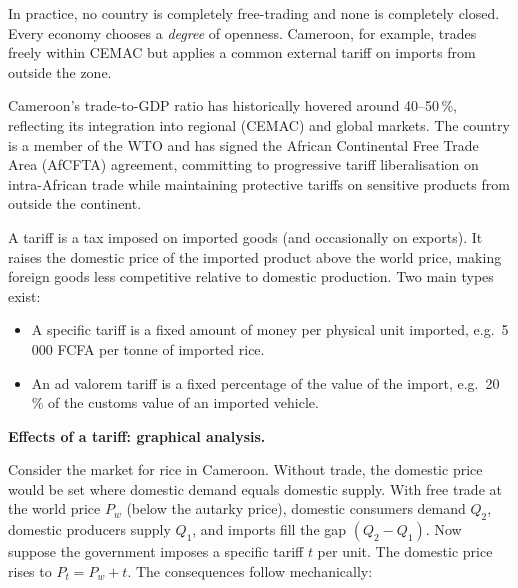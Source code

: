 \documentclass[11pt]{article}
\newcommand{\cle}[1]{{\popxbold\color{popdark}#1}}
\newcounter{popsec}
\newcounter{popsub}
\newcommand{\courssub}[1]{%
  \stepcounter{popsub}%
  \par\vspace{9pt}\noindent{\popxbold\fontsize{11.5}{13}\selectfont\color{popink}{\color{poporange}\thepopsec.\thepopsub}\hspace{6pt}#1}\par\nopagebreak\vspace{4pt}
}
\begin{document}
In practice, no country is completely free-trading and none is completely closed. Every economy chooses a \emph{degree} of openness. Cameroon, for example, trades freely within CEMAC but applies a common external tariff on imports from outside the zone.

\begin{savaistu}
Cameroon's trade-to-GDP ratio has historically hovered around 40--50\,\%, reflecting its integration into regional (CEMAC) and global markets. The country is a member of the WTO and has signed the African Continental Free Trade Area (AfCFTA) agreement, committing to progressive tariff liberalisation on intra-African trade while maintaining protective tariffs on sensitive products from outside the continent.
\end{savaistu}

\courssub{Tariffs}

\begin{definition}[Tariff]
A \cle{tariff} is a tax imposed on imported goods (and occasionally on exports). It raises the domestic price of the imported product above the world price, making foreign goods less competitive relative to domestic production. Two main types exist:
\begin{itemize}
\item A \cle{specific tariff} is a fixed amount of money per physical unit imported, e.g.\ 5\,000 FCFA per tonne of imported rice.
\item An \cle{ad valorem tariff} is a fixed percentage of the value of the import, e.g.\ 20\,\% of the customs value of an imported vehicle.
\end{itemize}
\end{definition}

\textbf{Effects of a tariff: graphical analysis.}\par
Consider the market for rice in Cameroon. Without trade, the domestic price would be set where domestic demand equals domestic supply. With free trade at the world price $P_w$ (below the autarky price), domestic consumers demand $Q_2$, domestic producers supply $Q_1$, and imports fill the gap $(Q_2 - Q_1)$. Now suppose the government imposes a specific tariff $t$ per unit. The domestic price rises to $P_t = P_w + t$. The consequences follow mechanically:
\end{document}
